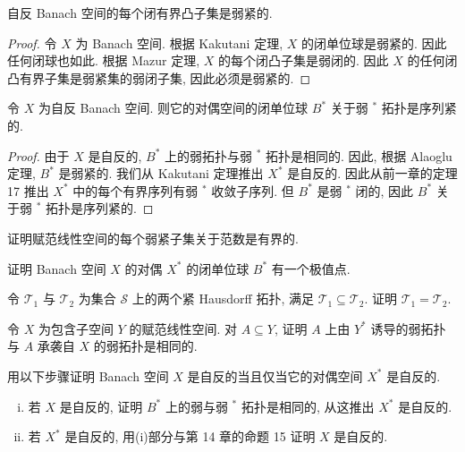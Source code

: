 \documentclass[../../main.tex]{subfiles}
\begin{document}
\begin{corollary}\label{corollary:ch15-closed-bounded-convex}
自反 Banach 空间的每个闭有界凸子集是弱紧的.
\end{corollary}

\begin{proof}
令 $X$ 为 Banach 空间. 根据 Kakutani 定理, $X$ 的闭单位球是弱紧的. 因此任何闭球也如此. 根据 Mazur 定理, $X$ 的每个闭凸子集是弱闭的. 因此 $X$ 的任何闭凸有界子集是弱紧集的弱闭子集, 因此必须是弱紧的.
\end{proof}

\begin{corollary}\label{corollary:ch15-reflexive-dual}
令 $X$ 为自反 Banach 空间. 则它的对偶空间的闭单位球 $B^{*}$ 关于弱 $^{*}$ 拓扑是序列紧的.
\end{corollary}

\begin{proof}
由于 $X$ 是自反的, $B^{*}$ 上的弱拓扑与弱 $^{*}$ 拓扑是相同的. 因此, 根据 Alaoglu 定理, $B^{*}$ 是弱紧的. 我们从 Kakutani 定理推出 $X^{*}$ 是自反的. 因此从前一章的定理 17 推出 $X^{*}$ 中的每个有界序列有弱 $^{*}$ 收敛子序列. 但 $B^{*}$ 是弱 $^{*}$ 闭的, 因此 $B^{*}$ 关于弱 $^{*}$ 拓扑是序列紧的.
\end{proof}

\begin{exercise}\label{exercise:ch15-06}
证明赋范线性空间的每个弱紧子集关于范数是有界的.
\end{exercise}

\begin{exercise}\label{exercise:ch15-07}
证明 Banach 空间 $X$ 的对偶 $X^{*}$ 的闭单位球 $B^{*}$ 有一个极值点.
\end{exercise}

\begin{exercise}\label{exercise:ch15-08}
令 $\mathcal{T}_{1}$ 与 $\mathcal{T}_{2}$ 为集合 $\mathcal{S}$ 上的两个紧 Hausdorff 拓扑, 满足 $\mathcal{T}_{1}\subseteq\mathcal{T}_{2}$. 证明 $\mathcal{T}_{1}=\mathcal{T}_{2}$.
\end{exercise}

\begin{exercise}\label{exercise:ch15-09}
令 $X$ 为包含子空间 $Y$ 的赋范线性空间. 对 $A\subseteq Y$, 证明 $A$ 上由 $Y^{*}$ 诱导的弱拓扑与 $A$ 承袭自 $X$ 的弱拓扑是相同的.
\end{exercise}

\begin{exercise}\label{exercise:ch15-10}
用以下步骤证明 Banach 空间 $X$ 是自反的当且仅当它的对偶空间 $X^{*}$ 是自反的.
\begin{enumerate}[(i)]
\item 若 $X$ 是自反的, 证明 $B^{*}$ 上的弱与弱 $^{*}$ 拓扑是相同的, 从这推出 $X^{*}$ 是自反的.
\item 若 $X^{*}$ 是自反的, 用(i)部分与第 14 章的命题 15 证明 $X$ 是自反的.
\end{enumerate}
\end{exercise}
\end{document}
